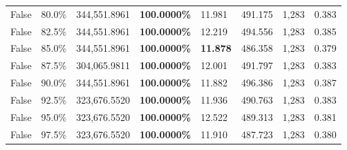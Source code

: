 \begin{table}[H]
\begin{tabular}{lllrllll}
\cline{1-8}
False & 80.0\% & 344,551.8961 & \bfseries \color{red} 100.0000\% & 11.981 & 491.175 & 1,283 & 0.383 \\
\cline{1-8}
False & 82.5\% & 344,551.8961 & \bfseries \color{red} 100.0000\% & 12.219 & 494.556 & 1,283 & 0.385 \\
\cline{1-8}
False & 85.0\% & 344,551.8961 & \bfseries \color{red} 100.0000\% & \bfseries \color{red} 11.878 & 486.358 & 1,283 & 0.379 \\
\cline{1-8}
False & 87.5\% & \color{red} 304,065.9811 & \bfseries \color{red} 100.0000\% & 12.001 & 491.797 & 1,283 & 0.383 \\
\cline{1-8}
False & 90.0\% & 344,551.8961 & \bfseries \color{red} 100.0000\% & 11.882 & 496.386 & 1,283 & 0.387 \\
\cline{1-8}
False & 92.5\% & 323,676.5520 & \bfseries \color{red} 100.0000\% & 11.936 & 490.763 & 1,283 & 0.383 \\
\cline{1-8}
False & 95.0\% & 323,676.5520 & \bfseries \color{red} 100.0000\% & 12.522 & 489.313 & 1,283 & 0.381 \\
\cline{1-8}
False & 97.5\% & 323,676.5520 & \bfseries \color{red} 100.0000\% & 11.910 & 487.723 & 1,283 & 0.380 \\
\cline{1-8}
\bottomrule
\end{tabular}
\end{table}

